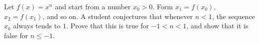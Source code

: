 Let $f(x)=x^n$ and start from a number $x_0>0$. Form $x_1=f(x_0)$, $x_2=f(x_1)$, and so on. A student conjectures that whenever $n<1$, the sequence $x_k$ always tends to $1$. Prove that this is true for $-1<n<1$, and show that it is false for $n\le-1$.
